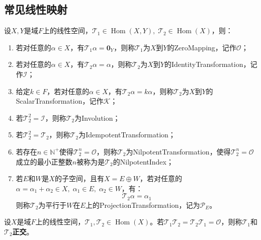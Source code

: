 \subsection{常见线性映射}
\begin{definition}
	设$X,Y$是域$F$上的线性空间，$\mathcal{T}_1\in\operatorname{Hom}(X,Y),\;\mathcal{T}_2\in\operatorname{Hom}(X)$，则：
	\begin{enumerate}
		\item 若对任意的$\alpha\in X$，有$\mathcal{T}_1\alpha=\mathbf{0}_Y$，则称$\mathcal{T}_1$为$X$到$Y$的\gls{ZeroMapping}，记作$\mathcal{O}$；
		\item 若对任意的$\alpha\in X$，有$\mathcal{T}_2\alpha=\alpha$，则称$\mathcal{T}_2$为$X$到$Y$的\gls{IdentityTransformation}，记作$\mathcal{I}$；
		\item 给定$k\in F$，若对任意的$\alpha\in X$，有$\mathcal{T}_2\alpha=k\alpha$，则称$\mathcal{T}_2$为$X$到$Y$的\gls{ScalarTransformation}，记作$\mathcal{K}$；
		\item 若$\mathcal{T}_2^2=\mathcal{I}$，则称$\mathcal{T}_2$为\gls{Involution}；
		\item 若$\mathcal{T}_2^2=\mathcal{T}_2$，则称$\mathcal{T}_2$为\gls{IdempotentTransformation}；
		\item 若存在$n\in\mathbb{N}^+$使得$\mathcal{T}_2^n=\mathcal{O}$，则称$\mathcal{T}_2$为\gls{NilpotentTransformation}，使得$\mathcal{T}_2^n=\mathcal{O}$成立的最小正整数$n$被称为是$\mathcal{T}_2$的\gls{NilpotentIndex}；
		\item 若$E$和$W$是$X$的子空间，且有$X=E\oplus W$，若对任意的$\alpha=\alpha_1+\alpha_2\in X,\;\alpha_1\in E,\;\alpha_2\in W$，有：
		\begin{equation*}
			\mathcal{T}_2\alpha=\alpha_1
		\end{equation*}
		则称$\mathcal{T}_2$为平行于$W$在$E$上的\gls{ProjectionTransformation}，记为$\mathcal{P}_E$。
	\end{enumerate}
\end{definition}
\begin{definition}
	设$X$是域$F$上的线性空间，$\mathcal{T}_1,\mathcal{T}_2\in \operatorname{Hom}(X)$。若$\mathcal{T}_1\mathcal{T}_2=\mathcal{T}_2\mathcal{T}_1=\mathcal{O}$，则称$\mathcal{T}_1$和$\mathcal{T}_2$\textbf{正交}。
\end{definition}

